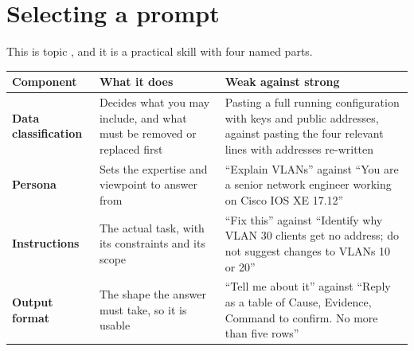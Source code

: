 \section{Selecting a prompt}

This is topic , and it is a practical skill with four named parts.

\begin{longtable}{@{}L{3.4cm}L{5.4cm}L{6.2cm}@{}}
\toprule
{}
\textbf{Component} & \textbf{What it does} & \textbf{Weak against strong} \\
\midrule
\endhead
\textbf{Data classification} &
Decides what you may include, and what must be removed or replaced first &
Pasting a full running configuration with keys and public addresses, against
pasting the four relevant lines with addresses re-written \\
\textbf{Persona} &
Sets the expertise and viewpoint to answer from &
``Explain VLANs'' against ``You are a senior network engineer working on Cisco
IOS XE 17.12'' \\
\textbf{Instructions} &
The actual task, with its constraints and its scope &
``Fix this'' against ``Identify why VLAN 30 clients get no address; do not
suggest changes to VLANs 10 or 20'' \\
\textbf{Output format} &
The shape the answer must take, so it is usable &
``Tell me about it'' against ``Reply as a table of Cause, Evidence, Command to
confirm. No more than five rows'' \\
\bottomrule
\end{longtable}

